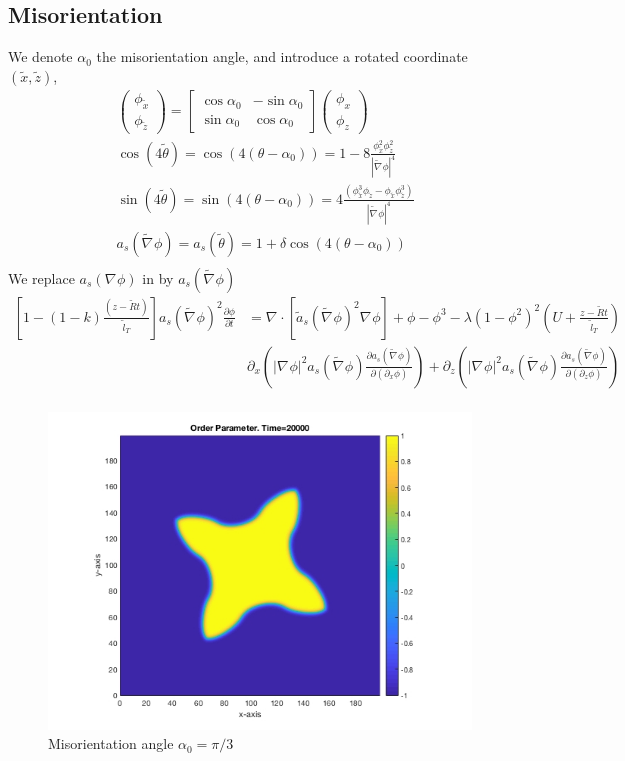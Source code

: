 \documentclass[a4paper,12pt]{article}
\renewcommand{\div}[1]{\nabla_{#1} \cdot}
\newcommand{\grad}[1]{\nabla_{#1}}
\newcommand{\T}[1]{\tilde{#1}}
\newcommand{\WT}[1]{\widetilde{#1}}
\begin{document}
\subsection{Misorientation}
We denote $\alpha_0$ the misorientation angle, and introduce a rotated coordinate $(\T{x},\T{z})$,
\begin{align}
& \left( 
\begin{array}{c}
\phi_{\T{x}} \\ 
\phi_{\T{z}}
\end{array}
\right)
=
\left[
\begin{array}{cc}
\cos \alpha_{0} & -\sin \alpha_{0} \\
\sin \alpha_{0} & \cos \alpha_{0}
\end{array}
\right]
\left( 
\begin{array}{c}
\phi_{x} \\ 
\phi_{z}
\end{array}
\right) \\
& \cos(4\T{\theta}) = \cos(4(\theta-\alpha_0)) =  1- 8 \frac{ \phi_{\T{x}}^2 \phi_{\T{z}}^2 }{|\WT{\grad{}} \phi|^4} \\
& \sin(4\T{\theta}) = \sin(4(\theta-\alpha_0)) =  4 \frac{(\phi_{\T{x}}^3 \phi_{\T{z}} - \phi_{\T{x}} \phi_{\T{z}}^3 )}{| \WT{\grad{}} \phi|^4} \\
& a_s(\WT{\grad{}} \phi  ) = a_s(\T{\theta} )=  1 + \delta \cos(4(\theta-\alpha_0) ) \\
\end{align}
 We replace $a_s(\grad{} \phi)$ in   by $a_s(\widetilde{\grad{}} \phi )$\cite{Takaki2014}
 \begin{align}
 \left[1-(1-k) \frac{(z- \tilde{R} t)}{ \tilde{l}_T} \right] a_s(\WT{\grad{}} \phi)^2 \frac{\partial \phi}{\partial t} &= 
  \div{} [\tilde{a}_s(\WT{\grad{}} \phi)^2 \grad{} \phi] + \phi - \phi^3 - \lambda (1-\phi^2)^2 \left(U + \frac{z-\tilde{R} t}{ \tilde{l}_T} \right) \nonumber \\
 & \partial_x \left( |\grad{} \phi|^2 a_s(\WT{\grad{}} \phi) \frac{\partial a_s(\WT{\grad{}} \phi)}{\partial (\partial_x \phi)}  \right)  + 
\partial_z \left( |\grad{} \phi|^2 a_s(\WT{\grad{}} \phi) \frac{\partial a_s(\WT{\grad{}} \phi)}{\partial (\partial_z \phi)}  \right)   \nonumber \\
\end{align}

\begin{figure}[h]
\centering
\includegraphics[width=0.5\linewidth]{./figures/misorientation.jpg}
\caption{Misorientation angle $\alpha_0 = \pi/3$}
\end{figure}
\end{document}
